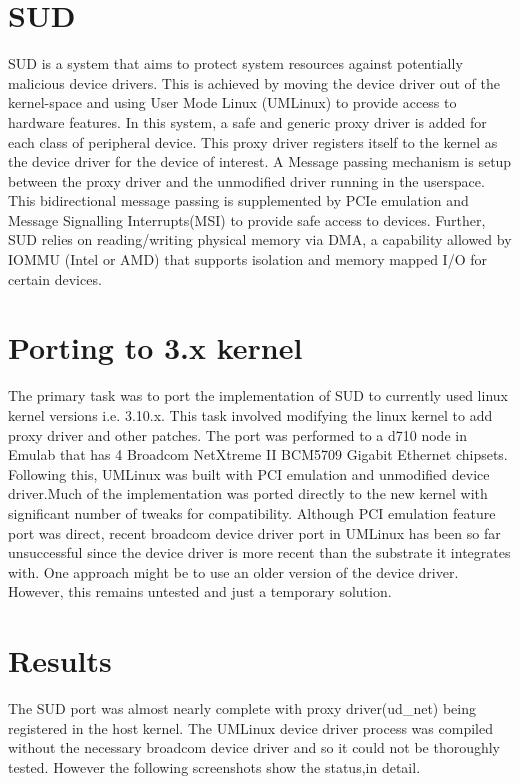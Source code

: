 \documentclass[11pt,titlepage,a4paper]{article}
\begin{document}
\section{SUD}
SUD is a system that aims to protect system resources against potentially malicious device drivers. This is achieved by moving the device driver out of the kernel-space and using User Mode Linux (UMLinux) to provide access to hardware features. In this system, a safe and generic proxy driver is added for each class of peripheral device. This proxy driver registers itself to the kernel as the device driver for the device of interest. A Message passing mechanism is setup between the proxy driver and the unmodified driver running in the userspace. This bidirectional message passing is supplemented by PCIe emulation and Message Signalling Interrupts(MSI) to provide safe access to devices. Further, SUD relies on reading/writing physical memory via DMA, a capability allowed by IOMMU (Intel or AMD) that supports isolation and memory mapped I/O for certain devices.
\section{Porting to 3.x kernel}
The primary task was to port the implementation of SUD to currently used linux kernel versions i.e. 3.10.x. This task involved modifying the linux kernel to add proxy driver and other patches. The port was performed to a d710 node in Emulab that has 4 Broadcom NetXtreme II BCM5709 Gigabit Ethernet chipsets. Following this, UMLinux was  built with PCI emulation and unmodified device driver.Much of the implementation was ported directly to the new kernel with significant number of tweaks for compatibility. Although PCI emulation feature port was direct, recent broadcom device driver port in UMLinux has been so far unsuccessful since the device driver is more recent than the substrate it integrates with. One approach might be to use an older version of the device driver. However, this remains untested and just a temporary solution.
\section{Results}
The SUD port was almost nearly complete with proxy driver(ud\_net) being registered in the host kernel. The UMLinux device driver process was compiled without the necessary broadcom device driver and so it could not be thoroughly tested. However the following screenshots show the status,in detail. 
\end{document}
